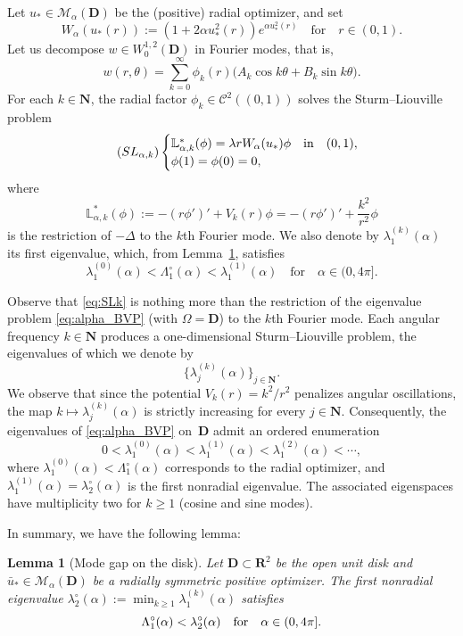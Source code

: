 \documentclass[reqno,11pt]{amsart}
\newtheorem{lemma}[theorem]{Lemma}
\theoremstyle{definition}
\begin{document}
Let $u_*\in\mathcal{M}_\alpha(\mathbf{D})$ be the (positive) radial optimizer, and set
\[
W_\alpha(u_*(r)):=(1+2\alpha u_*^2(r))e^{\alpha u_*^2(r)} \quad \text{for} \quad r\in(0,1).
\]
Let us decompose $w\in W^{1,2}_0(\mathbf{D})$ in Fourier modes, that is,
\[
w(r,\theta)=\sum_{k=0}^\infty\phi_k(r)\big(A_k\cos k\theta+B_k\sin k\theta\big).
\]
For each $k\in\mathbf{N}$, the radial factor $\phi_k\in \mathcal{C}^2((0,1))$ solves 
the Sturm--Liouville problem
\begin{equation}\label{eq:SLk}\tag{$SL_{\alpha, k}$}
\begin{cases}
\mathbb{L}^*_{\alpha,k} (\phi)=\lambda rW_\alpha(u_*)\phi \quad \text{in} \quad (0,1),\\
\phi(1)=\phi(0)=0,
\end{cases}
\end{equation}
where 
\[
\mathbb{L}^*_{\alpha,k} (\phi):=-(r\phi')'+V_k(r)\phi = -(r\phi')' + \frac{k^2}{r^2} \phi
\]
is the restriction of $-\Delta$ to the $k$th Fourier mode. 
We also denote by $\lambda_1^{(k)}(\alpha)$ its first eigenvalue, which, from Lemma~\ref{lem:mode_gap_disk}, satisfies
\[
\lambda_1^{(0)}(\alpha)<\Lambda_1^\circ(\alpha) <\lambda_{1}^{(1)}(\alpha)\quad\text{for}\quad \alpha\in(0,4\pi].
\]

Observe that \eqref{eq:SLk} is nothing more than the restriction of the eigenvalue problem \eqref{eq:alpha_BVP} (with $\Omega=\mathbf{D}$) to the $k$th Fourier mode.
Each angular frequency $k\in\mathbf{N}$ produces a one-dimensional Sturm--Liouville problem, the eigenvalues of which we denote by
\[
\{\lambda_j^{(k)}(\alpha)\}_{j\in\mathbf{N}}.
\]
We observe that since the potential $V_k(r)=k^2/r^2$ penalizes angular oscillations, the map $k\mapsto\lambda_j^{(k)}(\alpha)$ is strictly increasing for every $j\in\mathbf{N}$.
Consequently, the eigenvalues of \eqref{eq:alpha_BVP} on~$\mathbf{D}$ admit an ordered enumeration
\[
0<\lambda_1^{(0)}(\alpha)
<\lambda_1^{(1)}(\alpha)
<\lambda_1^{(2)}(\alpha)
<\cdots,
\]
where $\lambda_1^{(0)}(\alpha)<\Lambda_1^\circ(\alpha)$ corresponds to the radial optimizer,
and $\lambda_1^{(1)}(\alpha)=\lambda_2^\circ(\alpha)$ is the first nonradial eigenvalue.
The associated eigenspaces have multiplicity two for $k\ge 1$ (cosine and sine modes).

In summary, we have the following lemma:
\begin{lemma}[Mode gap on the disk]\label{lem:mode_gap_disk}
Let $\mathbf{D}\subset\mathbf{R}^2$ be the open unit disk and $\bar{u}_*\in\mathcal{M}_\alpha(\mathbf{D})$ be a radially symmetric positive optimizer.
The first nonradial eigenvalue
$\lambda_2^\circ(\alpha):=\min_{k\ge1}\lambda_1^{(k)}(\alpha)$ satisfies
\[
\Lambda_1^\circ(\alpha) < \lambda_{2}^\circ(\alpha) \quad {\rm for} \quad \alpha\in(0,4\pi].
\]
\end{lemma}
\end{document}
